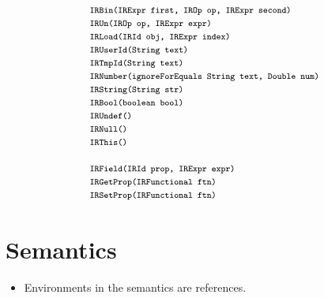 \documentclass[a4paper, leqno]{amsart}
\newcommand{\mtt}[1]{\mbox{\tt\footnotesize #1}}
\begin{document}
\[\begin{array}{l}
\mtt{IRBin(IRExpr first, IROp op, IRExpr second)}\\
\mtt{IRUn(IROp op, IRExpr expr)}\\
\mtt{IRLoad(IRId obj, IRExpr index)}\\
\mtt{IRUserId(String text)}\\
\mtt{IRTmpId(String text)}\\
\mtt{IRNumber(ignoreForEquals String text, Double num)}\\
\mtt{IRString(String str)}\\
\mtt{IRBool(boolean bool)}\\
\mtt{IRUndef()}\\
\mtt{IRNull()}\\
\mtt{IRThis()}\\\\

\mtt{IRField(IRId prop, IRExpr expr)}\\
\mtt{IRGetProp(IRFunctional ftn)}\\
\mtt{IRSetProp(IRFunctional ftn)}\\

\end{array}
\]

\newpage
\section{Semantics}

\begin{itemize}
\item  Environments in the semantics are references.
\end{itemize}
\end{document}
